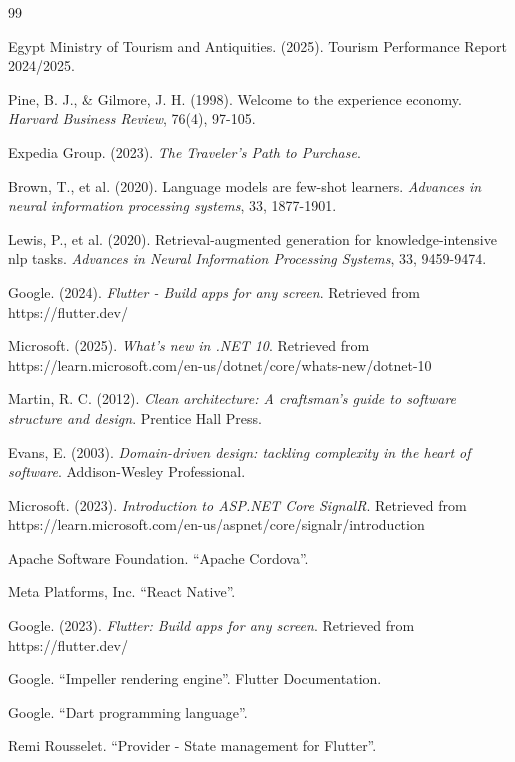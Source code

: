 \begin{thebibliography}{99}

Egypt Ministry of Tourism and Antiquities. (2025). Tourism Performance Report 2024/2025.

Pine, B. J., \& Gilmore, J. H. (1998). Welcome to the experience economy. \textit{Harvard Business Review}, 76(4), 97-105.

Expedia Group. (2023). \textit{The Traveler's Path to Purchase}.

Brown, T., et al. (2020). Language models are few-shot learners. \textit{Advances in neural information processing systems}, 33, 1877-1901.

Lewis, P., et al. (2020). Retrieval-augmented generation for knowledge-intensive nlp tasks. \textit{Advances in Neural Information Processing Systems}, 33, 9459-9474.

Google. (2024). \textit{Flutter - Build apps for any screen}. Retrieved from https://flutter.dev/

Microsoft. (2025). \textit{What's new in .NET 10}. Retrieved from https://learn.microsoft.com/en-us/dotnet/core/whats-new/dotnet-10

Martin, R. C. (2012). \textit{Clean architecture: A craftsman's guide to software structure and design}. Prentice Hall Press.

Evans, E. (2003). \textit{Domain-driven design: tackling complexity in the heart of software}. Addison-Wesley Professional.

Microsoft. (2023). \textit{Introduction to ASP.NET Core SignalR}. Retrieved from https://learn.microsoft.com/en-us/aspnet/core/signalr/introduction

Apache Software Foundation. ``Apache Cordova''.

Meta Platforms, Inc. ``React Native''.

Google. (2023). \textit{Flutter: Build apps for any screen}. Retrieved from https://flutter.dev/

Google. ``Impeller rendering engine''. Flutter Documentation.

Google. ``Dart programming language''.

Remi Rousselet. ``Provider - State management for Flutter''.


\end{thebibliography}
